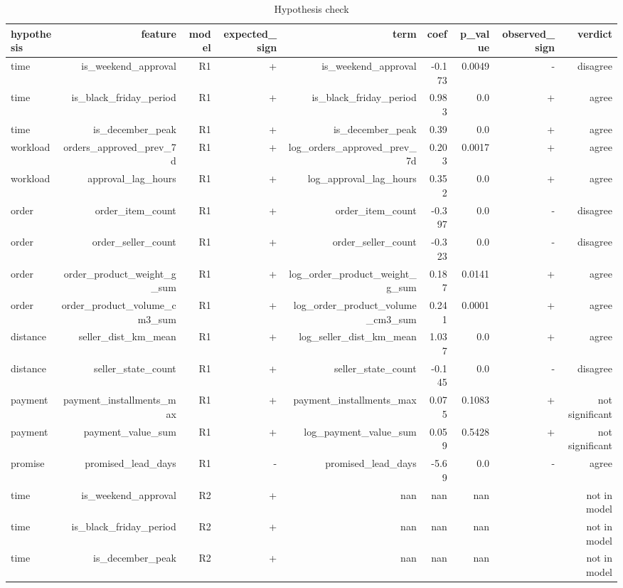 \begin{table}[htbp]
\centering
\small
\caption{Hypothesis check}
\begin{tabular}{lrrrrrrrr}
\toprule
hypothesis & feature & model & expected\_sign & term & coef & p\_value & observed\_sign & verdict \\
\midrule
time & is\_weekend\_approval & R1 & + & is\_weekend\_approval & -0.173 & 0.0049 & - & disagree \\
time & is\_black\_friday\_period & R1 & + & is\_black\_friday\_period & 0.983 & 0.0 & + & agree \\
time & is\_december\_peak & R1 & + & is\_december\_peak & 0.39 & 0.0 & + & agree \\
workload & orders\_approved\_prev\_7d & R1 & + & log\_orders\_approved\_prev\_7d & 0.203 & 0.0017 & + & agree \\
workload & approval\_lag\_hours & R1 & + & log\_approval\_lag\_hours & 0.352 & 0.0 & + & agree \\
order & order\_item\_count & R1 & + & order\_item\_count & -0.397 & 0.0 & - & disagree \\
order & order\_seller\_count & R1 & + & order\_seller\_count & -0.323 & 0.0 & - & disagree \\
order & order\_product\_weight\_g\_sum & R1 & + & log\_order\_product\_weight\_g\_sum & 0.187 & 0.0141 & + & agree \\
order & order\_product\_volume\_cm3\_sum & R1 & + & log\_order\_product\_volume\_cm3\_sum & 0.241 & 0.0001 & + & agree \\
distance & seller\_dist\_km\_mean & R1 & + & log\_seller\_dist\_km\_mean & 1.037 & 0.0 & + & agree \\
distance & seller\_state\_count & R1 & + & seller\_state\_count & -0.145 & 0.0 & - & disagree \\
payment & payment\_installments\_max & R1 & + & payment\_installments\_max & 0.075 & 0.1083 & + & not significant \\
payment & payment\_value\_sum & R1 & + & log\_payment\_value\_sum & 0.059 & 0.5428 & + & not significant \\
promise & promised\_lead\_days & R1 & - & promised\_lead\_days & -5.69 & 0.0 & - & agree \\
time & is\_weekend\_approval & R2 & + & nan & nan & nan &  & not in model \\
time & is\_black\_friday\_period & R2 & + & nan & nan & nan &  & not in model \\
time & is\_december\_peak & R2 & + & nan & nan & nan &  & not in model \\

\end{tabular}
\end{table}

